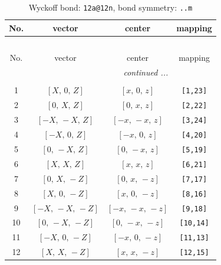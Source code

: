 \documentclass[fleqn,8pt]{jsarticle}
\begin{document}
\begin{longtable}{cccc}
\caption{Wyckoff bond: {\tt 12a@12n}, bond symmetry: {\tt ..m}}
 \\
 \hline \hline
No. & vector & center & mapping \\ \hline \endfirsthead

\multicolumn{3}{l}{\tablename\ \thetable{}} \\
 \hline \hline
No. & vector & center & mapping \\ \hline \endhead

 \hline \hline
\multicolumn{3}{r}{\footnotesize\it continued ...} \\ \endfoot

 \hline \hline
\multicolumn{3}{r}{} \\ \endlastfoot

1 & $\left[ X,\, 0,\, Z \right]$ & $\left[ x,\, 0,\, z \right]$ & {\tt [1,23]} \\ \hline
2 & $\left[ 0,\, X,\, Z \right]$ & $\left[ 0,\, x,\, z \right]$ & {\tt [2,22]} \\ \hline
3 & $\left[ - X,\, - X,\, Z \right]$ & $\left[ - x,\, - x,\, z \right]$ & {\tt [3,24]} \\ \hline
4 & $\left[ - X,\, 0,\, Z \right]$ & $\left[ - x,\, 0,\, z \right]$ & {\tt [4,20]} \\ \hline
5 & $\left[ 0,\, - X,\, Z \right]$ & $\left[ 0,\, - x,\, z \right]$ & {\tt [5,19]} \\ \hline
6 & $\left[ X,\, X,\, Z \right]$ & $\left[ x,\, x,\, z \right]$ & {\tt [6,21]} \\ \hline
7 & $\left[ 0,\, X,\, - Z \right]$ & $\left[ 0,\, x,\, - z \right]$ & {\tt [7,17]} \\ \hline
8 & $\left[ X,\, 0,\, - Z \right]$ & $\left[ x,\, 0,\, - z \right]$ & {\tt [8,16]} \\ \hline
9 & $\left[ - X,\, - X,\, - Z \right]$ & $\left[ - x,\, - x,\, - z \right]$ & {\tt [9,18]} \\ \hline
10 & $\left[ 0,\, - X,\, - Z \right]$ & $\left[ 0,\, - x,\, - z \right]$ & {\tt [10,14]} \\ \hline
11 & $\left[ - X,\, 0,\, - Z \right]$ & $\left[ - x,\, 0,\, - z \right]$ & {\tt [11,13]} \\ \hline
12 & $\left[ X,\, X,\, - Z \right]$ & $\left[ x,\, x,\, - z \right]$ & {\tt [12,15]} \\
\end{longtable}
\renewcommand{\arraystretch}{1.2}
\end{document}

